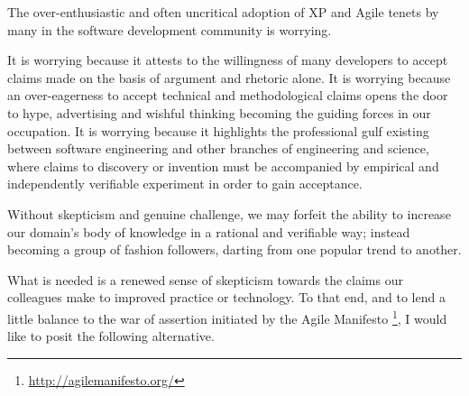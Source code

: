 \documentclass{article}
\begin{document}
The over-enthusiastic and often uncritical adoption of XP and Agile
tenets by many in the software development community is worrying.

It is worrying because it attests to the willingness of many developers
to accept claims made on the basis of argument and rhetoric alone. It is
worrying because an over-eagerness to accept technical and
methodological claims opens the door to hype, advertising and wishful
thinking becoming the guiding forces in our occupation. It is worrying
because it highlights the professional gulf existing between software
engineering and other branches of engineering and science, where claims
to discovery or invention must be accompanied by empirical and
independently verifiable experiment in order to gain acceptance.

Without skepticism and genuine challenge, we may forfeit the ability to
increase our domain's body of knowledge in a rational and verifiable
way; instead becoming a group of fashion followers, darting from one
popular trend to another.

What is needed is a renewed sense of skepticism towards the claims our
colleagues make to improved practice or technology. To that end, and to
lend a little balance to the war of assertion initiated by the Agile
Manifesto \footnote{\url{http://agilemanifesto.org/}}, I would like to posit the following alternative.
\end{document}
